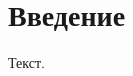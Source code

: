 \documentclass{article}
\begin{document}
\makeatletter{}\makeatother
\section{Введение}
Текст.
\end{document}
